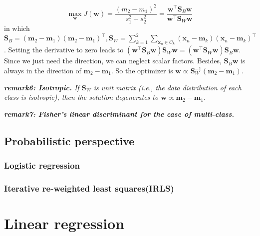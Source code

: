\documentclass{article}
\begin{document}
	
	\begin{equation}
	\max_\mathbf{w} J(\mathbf{w}) = \frac{(m_2-m_1)^2}{s_1^2+s_2^2} 
	= \frac{\mathbf{w}^\top \mathbf{S}_B \mathbf{w}}{\mathbf{w}^\top \mathbf{S}_W \mathbf{w}}
	\end{equation}
in which $\mathbf{S}_B=(\mathbf{m}_2-\mathbf{m}_1)(\mathbf{m}_2-\mathbf{m}_1)^\top, \mathbf{S}_W=\sum_{k=1}^2\sum_{\mathbf{x}_n\in C_k}(\mathbf{x}_n-\mathbf{m}_k)(\mathbf{x}_n-\mathbf{m}_k)^\top$. Setting the derivative to zero leads to $(\mathbf{w}^\top \mathbf{S}_B \mathbf{w}) \mathbf{S}_W \mathbf{w} = (\mathbf{w}^\top \mathbf{S}_W \mathbf{w}) \mathbf{S}_B \mathbf{w}$. Since we just need the direction, we can neglect scalar factors. Besides,  $\mathbf{S}_B \mathbf{w}$ is always in the direction of $\mathbf{m}_2 - \mathbf{m}_1$. So the optimizer is $\mathbf{w}\propto \mathbf{S}_W^{-1} (\mathbf{m}_2-\mathbf{m}_1)$.
	
	\begin{framed}
	\begin{scriptsize}
	\begin{spacing}{1.2}
	\noindent\textit{\textbf{remark6: Isotropic.} If $\mathbf{S}_W$ is unit matrix (i.e., the data distribution of each class is isotropic), then the solution degenerates to $	\mathbf{w}\propto \mathbf{m}_2-\mathbf{m}_1$.} 
	
	\noindent\textit{\textbf{remark7: Fisher's linear discriminant for the case of multi-class.}}
	\end{spacing}
	\end{scriptsize}
	\end{framed}
		
	\subsection{Probabilistic perspective}
	
	\subsubsection{Logistic regression}
	\label{sec-lr}
	
	\subsubsection{Iterative re-weighted least squares(IRLS)}

\section{Linear regression}
\end{document}
